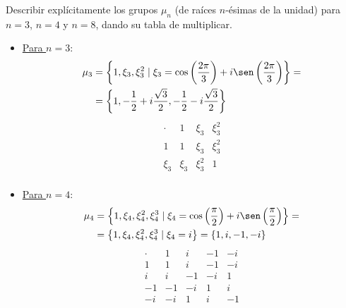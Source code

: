 \begin{ejercicio}\label{ej:2.4}
    Describir explícitamente los grupos $\mu_n$ (de raíces $n$-ésimas de la unidad) para $n = 3$, $n = 4$ y $n = 8$, dando su tabla de multiplicar.
    \begin{itemize}
        \item \ul{Para $n = 3$}:
        \begin{align*}
            \mu_3 &= \left\{1, \xi_3,\xi_3^2 \mid \xi_3 = \cos\left(\frac{2\pi}{3}\right) + i\sen\left(\frac{2\pi}{3}\right)\right\}
            =\\&= \left\{1, -\frac{1}{2} + i\frac{\sqrt{3}}{2}, -\frac{1}{2} - i\frac{\sqrt{3}}{2}\right\}
        \end{align*}
        \begin{equation*}
            \begin{array}{c|ccc}
                \cdot & 1 & \xi_3 & \xi_3^2 \\ \hline
                1 & 1 & \xi_3 & \xi_3^2 \\
                \xi_3 & \xi_3 & \xi_3^2 & 1 \\
            \end{array}
        \end{equation*}

        \item \ul{Para $n = 4$}:
        \begin{align*}
            \mu_4 &= \left\{1, \xi_4, \xi_4^2, \xi_4^3 \mid \xi_4 = \cos\left(\frac{\pi}{2}\right) + i\sen\left(\frac{\pi}{2}\right)\right\}
            =\\&= \left\{1, \xi_4, \xi_4^2, \xi_4^3 \mid \xi_4 = i\right\}
            = \left\{1, i, -1, -i\right\}
        \end{align*}
        \begin{equation*}
            \begin{array}{c|cccc}
                \cdot & 1 & i & -1 & -i \\ \hline
                1 & 1 & i & -1 & -i \\
                i & i & -1 & -i & 1 \\
                -1 & -1 & -i & 1 & i \\
                -i & -i & 1 & i & -1
            \end{array}
        \end{equation*}


\end{itemize}
\end{ejercicio}
